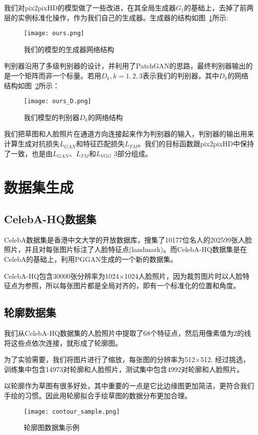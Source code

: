 我们对pix2pixHD的模型做了一些改进，在其全局生成器$G_1$的基础上，去掉了前两层的实例标准化操作，作为我们自己的生成器。生成器的结构如图~\ref{fig:ours}所示:
\begin{figure}[htb]
	\centering
	\texttt{[image: ours.png]}
	\caption{我们的模型的生成器网络结构}
	\label{fig:ours}
\end{figure}

判别器沿用了多级判别器的设计，并利用了PatchGAN\cite{pix2pix}的思路，最终判别器输出的是一个矩阵而非一个标量。若用$D_k,k=1,2,3$表示我们的判别器，其中$D_k$的网络结构如图~\ref{fig:ours_D}所示：
\begin{figure}[htb]
	\centering
	\texttt{[image: ours\_D.png]}
	\caption{我们模型的判别器$D_k$的网络结构}
	\label{fig:ours_D}
\end{figure}

我们把草图和人脸照片在通道方向连接起来作为判别器的输入，判别器的输出用来计算生成对抗损失$L_{GAN}$和特征匹配损失$L_{FM}$。我们的目标函数跟pix2pixHD中保持了一致，也是由$L_{GAN}$、$L_{FM}$和$L_{VGG}$ 3部分组成。

\section{数据集生成}

\subsection{CelebA-HQ数据集}

CelebA数据集是香港中文大学的开放数据库，搜集了10177位名人的202599张人脸照片，并且对每张图片标注了人脸特征点(landmark)。而CelebA-HQ数据集是在CelebA的基础上，利用PGGAN\cite{pggan}生成的一个新的数据集。

CelebA-HQ包含30000张分辨率为1024×1024人脸照片，因为裁剪图片时以人脸特征点为参照，所以每张图片都是全局对齐的，即有一个标准化的位置和角度。

\subsection{轮廓数据集}

我们从CelebA-HQ数据集的人脸照片中提取了68个特征点，然后用像素值为2的线将这些点依次连接，就形成了轮廓图。

为了实验需要，我们将图片进行了缩放，每张图的分辨率为512×512. 经过挑选，训练集中包含14973对轮廓和人脸照片，测试集中包含4992对轮廓和人脸照片。

以轮廓作为草图有很多好处，其中重要的一点是它比边缘图更加简洁，更符合我们手绘的习惯。因此用轮廓拟合手绘草图的数据分布更加合理。
\begin{figure}[htb]
	\centering
	\texttt{[image: contour\_sample.png]}
	\caption{轮廓图数据集示例}
	\label{fig:contour_sample}
\end{figure}

